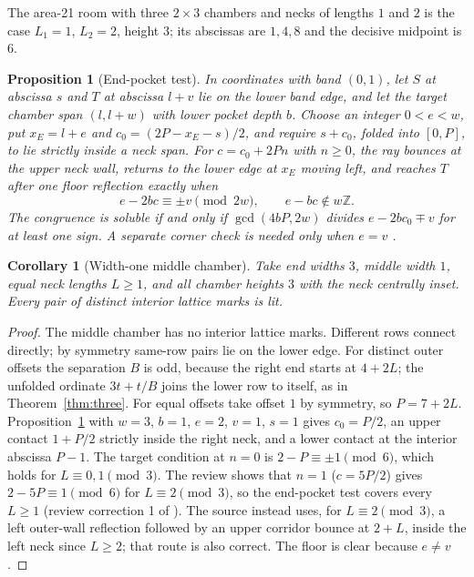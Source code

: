 \documentclass[11pt]{article}
\newtheorem{proposition}{Proposition}
\newtheorem{corollary}{Corollary}
\theoremstyle{definition}
\theoremstyle{remark}
\newcommand{\Z}{\mathbb Z}
\begin{document}
The area-21 room with three $2\times 3$ chambers and necks of lengths $1$ and $2$
is the case $L_1=1$, $L_2=2$, height $3$; its abscissas are $1,4,8$ and the
decisive midpoint is $6$.

\begin{proposition}[End-pocket test]\label{prop:endpocket}
In coordinates with band $(0,1)$, let $S$ at abscissa $s$ and $T$ at abscissa
$l+v$ lie on the lower band edge, and let the target chamber span $(l,l+w)$ with
lower pocket depth $b$. Choose an integer $0<e<w$, put $x_E=l+e$ and
$c_0=(2P-x_E-s)/2$, and require $s+c_0$, folded into $[0,P]$, to lie strictly
inside a neck span. For $c=c_0+2Pn$ with $n\ge 0$, the ray bounces at the upper
neck wall, returns to the lower edge at $x_E$ moving left, and reaches $T$ after
one floor reflection exactly when
\[
e-2bc\equiv\pm v\pmod{2w},\qquad e-bc\notin w\Z.
\]
The congruence is soluble if and only if $\gcd(4bP,2w)$ divides $e-2bc_0\mp v$ for
at least one sign. A separate corner check is needed only when $e=v$
\cite{R5,d203}.
\end{proposition}

\begin{corollary}[Width-one middle chamber]\label{cor:w1}
Take end widths $3$, middle width $1$, equal neck lengths $L\ge 1$, and all
chamber heights $3$ with the neck centrally inset. Every pair of distinct interior
lattice marks is lit.
\end{corollary}

\begin{proof}
The middle chamber has no interior lattice marks. Different rows connect
directly; by symmetry same-row pairs lie on the lower edge. For distinct outer
offsets the separation $B$ is odd, because the right end starts at $4+2L$; the
unfolded ordinate $3t+t/B$ joins the lower row to itself, as in
Theorem~\ref{thm:three}. For equal offsets take offset $1$ by symmetry, so
$P=7+2L$. Proposition~\ref{prop:endpocket} with $w=3$, $b=1$, $e=2$, $v=1$,
$s=1$ gives $c_0=P/2$, an upper contact $1+P/2$ strictly inside the right neck,
and a lower contact at the interior abscissa $P-1$. The target condition at
$n=0$ is $2-P\equiv\pm 1\pmod 6$, which holds for $L\equiv 0,1\pmod 3$. The review
shows that $n=1$ ($c=5P/2$) gives $2-5P\equiv 1\pmod 6$ for $L\equiv 2\pmod 3$, so
the end-pocket test covers every $L\ge 1$ (review correction 1 of \cite{d203}).
The source instead uses, for $L\equiv 2\pmod 3$, a left outer-wall reflection
followed by an upper corridor bounce at $2+L$, inside the left neck since
$L\ge 2$; that route is also correct. The floor is clear because $e\ne v$.
\end{proof}
\end{document}
